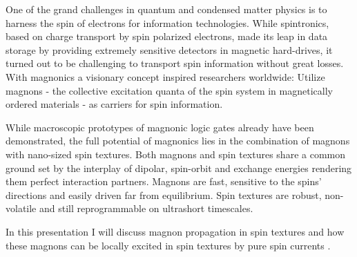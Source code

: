 One of the grand challenges in quantum and condensed matter physics is to harness the spin of electrons for information technologies. While spintronics, based on charge transport by spin polarized electrons, made its leap in data storage by providing extremely sensitive detectors in magnetic hard-drives, it turned out to be challenging to transport spin information without great losses. With magnonics a visionary concept inspired researchers worldwide: Utilize magnons - the collective excitation quanta of the spin system in magnetically ordered materials - as carriers for spin information.

While macroscopic prototypes of magnonic logic gates already have been demonstrated, the full potential of magnonics lies in the combination of magnons with nano-sized spin textures. Both magnons and spin textures share a common ground set by the interplay of dipolar, spin-orbit and exchange energies rendering them perfect interaction partners. Magnons are fast, sensitive to the spins' directions and easily driven far from equilibrium. Spin textures are robust, non-volatile and still reprogrammable on ultrashort timescales.

In this presentation I will discuss magnon propagation in spin textures and how these magnons can be locally excited in spin textures by pure spin currents \cite{Wagner_2016,Vogt_2014}.